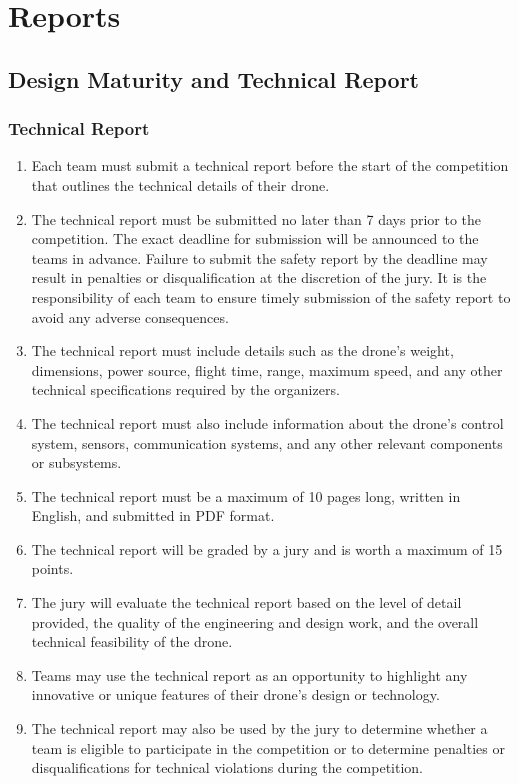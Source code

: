     \section{Reports}

    \subsection{Design Maturity and Technical Report}
    \subsubsection{Technical Report}
    \begin{enumerate}
    \item Each team must submit a technical report before the start of the competition that outlines the technical details of their drone.
    \item The technical report must be submitted no later than 7 days prior to the competition. The exact deadline for submission will be announced to the teams in advance. Failure to submit the safety report by the deadline may result in penalties or disqualification at the discretion of the jury. It is the responsibility of each team to ensure timely submission of the safety report to avoid any adverse consequences.
    \item The technical report must include details such as the drone's weight, dimensions, power source, flight time, range, maximum speed, and any other technical specifications required by the organizers.
    \item The technical report must also include information about the drone's control system, sensors, communication systems, and any other relevant components or subsystems.
    \item The technical report must be a maximum of 10 pages long, written in English, and submitted in PDF format.
    \item The technical report will be graded by a jury and is worth a maximum of 15 points.
    \item The jury will evaluate the technical report based on the level of detail provided, the quality of the engineering and design work, and the overall technical feasibility of the drone.
    \item Teams may use the technical report as an opportunity to highlight any innovative or unique features of their drone's design or technology.
    \item The technical report may also be used by the jury to determine whether a team is eligible to participate in the competition or to determine penalties or disqualifications for technical violations during the competition.
    \end{enumerate}
    
